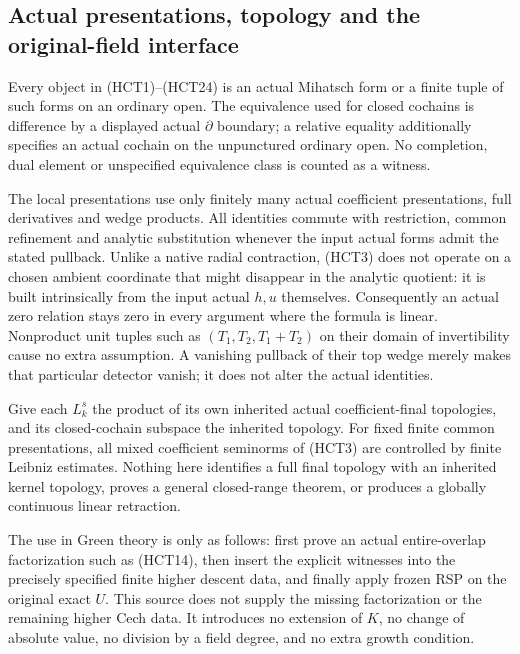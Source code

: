 \subsection{Actual presentations, topology and the original-field interface}

Every object in (HCT1)--(HCT24) is an actual Mihatsch form or a finite
tuple of such forms on an ordinary open.  The equivalence used for
closed cochains is difference by a displayed actual $\partial$
boundary; a relative equality additionally specifies an actual
cochain on the unpunctured ordinary open.  No completion, dual
element or unspecified equivalence class is counted as a witness.

The local presentations use only finitely many actual coefficient
presentations, full derivatives and wedge products.  All identities
commute with restriction, common refinement and analytic substitution
whenever the input actual forms admit the stated pullback.  Unlike a
native radial contraction, (HCT3) does not operate on a chosen ambient
coordinate that might disappear in the analytic quotient: it is built
intrinsically from the input actual $h,u$ themselves.  Consequently
an actual zero relation stays zero in every argument where the formula
is linear.  Nonproduct unit tuples such as $(T_1,T_2,T_1+T_2)$ on
their domain of invertibility cause no extra assumption.  A vanishing
pullback of their top wedge merely makes that particular detector
vanish; it does not alter the actual identities.

Give each $L_k^s$ the product of its own inherited actual coefficient-final
topologies, and its closed-cochain subspace the inherited topology.
For fixed finite common presentations, all mixed coefficient
seminorms of (HCT3) are controlled by finite Leibniz estimates.
Nothing here identifies a full final topology with an inherited
kernel topology, proves a general closed-range theorem, or produces
a globally continuous linear retraction.

The use in Green theory is only as follows: first prove an actual
entire-overlap factorization such as (HCT14), then insert the explicit
witnesses into the precisely specified finite higher descent data,
and finally apply frozen RSP on the original exact $U$.  This source
does not supply the missing factorization or the remaining higher
Cech data.  It introduces no extension of $K$, no change of absolute
value, no division by a field degree, and no extra growth condition.

